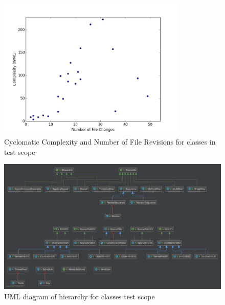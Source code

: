 \documentclass[11pt]{article}
\begin{document}
\begin{figure}[htp]
\centering
\includegraphics[width=0.8\textwidth]{Appendix/complexityVchange}
\caption{Cyclomatic Complexity and Number of File Revisions for classes in test scope}
\label{fig:complexityVchange}
\end{figure}

\begin{figure}[htp]
\centering
\includegraphics[width=\textwidth]{Appendix/UML}
\caption{UML diagram of hierarchy for classes test scope}
\label{fig:uml}
\end{figure}
\end{document}
